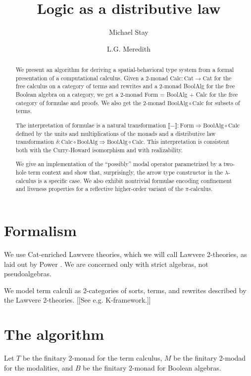 \documentclass{llncs}
\title{Logic as a distributive law}
\author{
Michael Stay\inst{1}\\
\and
L.G. Meredith\inst{2}\\
}
\institute{
  {Pyrofex Corp.}\\
  \email{\fontsize{8}{8}\selectfont stay@pyrofex.net}\\
  \and
  {Synereo, Ltd}\\
  \email{\fontsize{8}{8}\selectfont greg@synereo.com}
}
\newcommand{\interp}[1]{\llbracket #1 \rrbracket}
\newcommand{\maps}{\colon}
\renewcommand{\:}{\colon}
\newcommand{\Cat}{\mathrm{Cat}}
\newcommand{\Calc}{\mathrm{Calc}}
\newcommand{\BoolAlg}{\mathrm{BoolAlg}}
\renewcommand{\Form}{\mathrm{Form}}
\begin{document}
\maketitle
\begin{abstract}
\noindent
  We present an algorithm for deriving a spatial-behavioral type
  system from a formal presentation of a computational calculus.
  Given a 2-monad $\Calc\maps \Cat \to \Cat$ for the free calculus on
  a category of terms and rewrites and a 2-monad BoolAlg for the free
  Boolean algebra on a category, we get a 2-monad Form = BoolAlg +
  Calc for the free category of formulae and proofs.  We also get the
  2-monad $\BoolAlg \circ \Calc$ for subsets of terms.  

  The interpretation of formulae is a natural transformation
  $\interp{-} \maps \Form \Rightarrow \BoolAlg \circ \Calc$ defined by
  the units and multiplications of the monads and a distributive law
  transformation $\delta\maps \Calc \circ \BoolAlg \Rightarrow
  \BoolAlg \circ \Calc.$  This interpretation is consistent both with
  the Curry-Howard isomorphism and with realizability.  

  We give an implementation of the ``possibly'' modal operator
  parametrized by a two-hole term context and show that, surprisingly,
  the arrow type constructor in the $\lambda$-calculus is a specific
  case.  We also exhibit nontrivial formulae encoding confinement and
  liveness properties for a reflective higher-order variant of the
  $\pi$-calculus.  

\end{abstract}

\section{Formalism}

We use Cat-enriched Lawvere theories, which we will call Lawvere 2-theories, as laid out by Power \cite{PowerEnriched}.  We are concerned only with strict algebras, not pseudoalgebras.

We model term calculi as 2-categories of sorts, terms, and rewrites described by the Lawvere 2-theories.  [[See e.g. K-framework.]]

\section{The algorithm}

Let $T$ be the finitary 2-monad for the term calculus, $M$ be the finitary 2-modad for the modalities, and $B$ be the finitary 2-monad for Boolean algebras.
\end{document}
